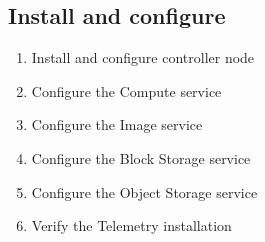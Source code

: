     \subsection{Install and configure}
    \begin{enumerate}
        \item Install and configure controller node
        \item Configure the Compute service
        \item Configure the Image service
        \item Configure the Block Storage service
        \item Configure the Object Storage service
        \item Verify the Telemetry installation
    \end{enumerate}
